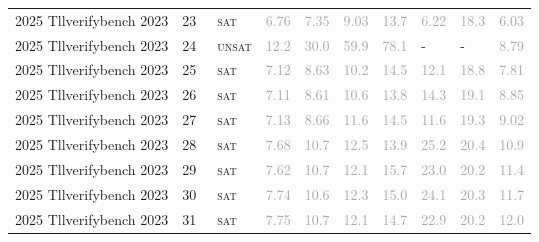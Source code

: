 \begin{center}
{\begin{longtable}{@{}llllllllll@{}}
2025 Tllverifybench 2023 & 23 & ~\textsc{sat} & \textcolor{darkgray}{6.76} & \textcolor{darkgray}{7.35} & \textcolor{darkgray}{9.03} & \textcolor{darkgray}{13.7} & \textcolor{darkgray}{6.22} & \textcolor{darkgray}{18.3} & \textcolor{darkgray}{6.03} \\
2025 Tllverifybench 2023 & 24 & ~\textsc{unsat} & \textcolor{darkgray}{12.2} & \textcolor{darkgray}{30.0} & \textcolor{darkgray}{59.9} & \textcolor{darkgray}{78.1} & - & - & \textcolor{darkgray}{8.79} \\
2025 Tllverifybench 2023 & 25 & ~\textsc{sat} & \textcolor{darkgray}{7.12} & \textcolor{darkgray}{8.63} & \textcolor{darkgray}{10.2} & \textcolor{darkgray}{14.5} & \textcolor{darkgray}{12.1} & \textcolor{darkgray}{18.8} & \textcolor{darkgray}{7.81} \\
2025 Tllverifybench 2023 & 26 & ~\textsc{sat} & \textcolor{darkgray}{7.11} & \textcolor{darkgray}{8.61} & \textcolor{darkgray}{10.6} & \textcolor{darkgray}{13.8} & \textcolor{darkgray}{14.3} & \textcolor{darkgray}{19.1} & \textcolor{darkgray}{8.85} \\
2025 Tllverifybench 2023 & 27 & ~\textsc{sat} & \textcolor{darkgray}{7.13} & \textcolor{darkgray}{8.66} & \textcolor{darkgray}{11.6} & \textcolor{darkgray}{14.5} & \textcolor{darkgray}{11.6} & \textcolor{darkgray}{19.3} & \textcolor{darkgray}{9.02} \\
2025 Tllverifybench 2023 & 28 & ~\textsc{sat} & \textcolor{darkgray}{7.68} & \textcolor{darkgray}{10.7} & \textcolor{darkgray}{12.5} & \textcolor{darkgray}{13.9} & \textcolor{darkgray}{25.2} & \textcolor{darkgray}{20.4} & \textcolor{darkgray}{10.9} \\
2025 Tllverifybench 2023 & 29 & ~\textsc{sat} & \textcolor{darkgray}{7.62} & \textcolor{darkgray}{10.7} & \textcolor{darkgray}{12.1} & \textcolor{darkgray}{15.7} & \textcolor{darkgray}{23.0} & \textcolor{darkgray}{20.2} & \textcolor{darkgray}{11.4} \\
2025 Tllverifybench 2023 & 30 & ~\textsc{sat} & \textcolor{darkgray}{7.74} & \textcolor{darkgray}{10.6} & \textcolor{darkgray}{12.3} & \textcolor{darkgray}{15.0} & \textcolor{darkgray}{24.1} & \textcolor{darkgray}{20.3} & \textcolor{darkgray}{11.7} \\
2025 Tllverifybench 2023 & 31 & ~\textsc{sat} & \textcolor{darkgray}{7.75} & \textcolor{darkgray}{10.7} & \textcolor{darkgray}{12.1} & \textcolor{darkgray}{14.7} & \textcolor{darkgray}{22.9} & \textcolor{darkgray}{20.2} & \textcolor{darkgray}{12.0} \\
\bottomrule
\end{longtable}
}
\end{center}


